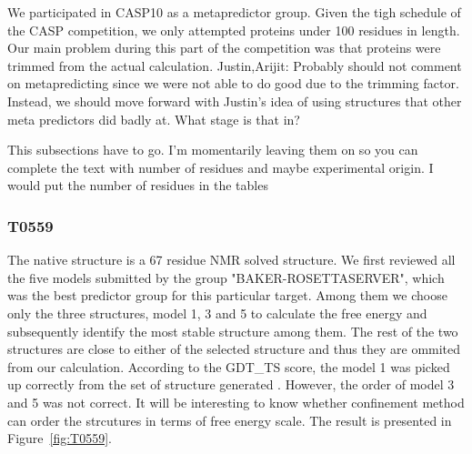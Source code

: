 \documentclass[12pt]{article}
\newcommand{\Alberto}[1]{\color{ForestGreen}#1\normalcolor }
\begin{document}
We participated in CASP10 as a metapredictor group. Given the tigh schedule of the CASP competition,
we only attempted proteins under 100 residues in length. Our main problem during this part of the
competition was that proteins were trimmed from the actual calculation.
\Alberto{Justin,Arijit: Probably should not comment on metapredicting since we were not able to do
    good due to the trimming factor. Instead, we should move forward with Justin's idea of using
    structures that other meta predictors did badly at. What stage is that in?}


\Alberto{This subsections have to go. I'm momentarily leaving them on so you can complete the text
    with number of residues and maybe experimental origin. I would put the number of residues in the
    tables}
\subsubsection{T0559}

The native structure is a  67 residue NMR solved structure. We first reviewed all the five models
submitted by the group "BAKER-ROSETTASERVER", which was the best predictor group for this particular
target.  Among them we choose only the three structures, model 1, 3 and 5 to calculate the free
energy and subsequently identify the most stable structure among them. The rest of the two
structures are close to either of the selected structure and thus they are ommited from our
calculation. According to the GDT\_TS score, the model 1 was picked up correctly from the set of
structure generated . However, the order of model 3 and 5 was not correct.
It will be interesting to know whether confinement method can order the strcutures in terms
of free energy scale. The result is presented in Figure~\ref{fig:T0559}.
\end{document}
